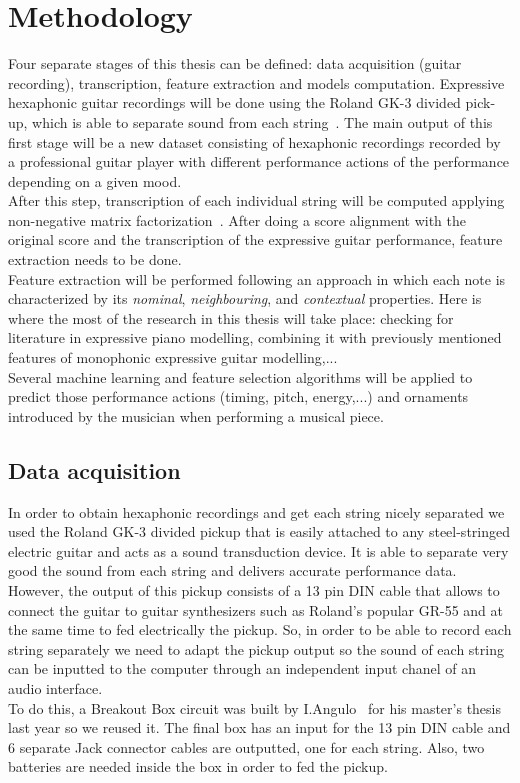 \chapter{Methodology}
\label{chap:methods}
Four separate stages of this thesis can be defined: data acquisition (guitar recording), transcription, feature extraction and models computation. Expressive hexaphonic guitar recordings will be done using the Roland GK-3 divided pick-up, which is able to separate sound from each string~\cite{Angulo2016}. The main output of this first stage will be a new dataset consisting of hexaphonic recordings recorded by a professional guitar player with different performance actions of the performance depending on a given mood. \\
After this step, transcription of each individual string will be computed applying non-negative matrix factorization~\cite{OGrady2009}. After doing a score alignment with the original score and the transcription of the expressive guitar performance, feature extraction needs to be done.\\
Feature extraction will be performed following an approach in which each note is characterized by its \textit{nominal}, \textit{neighbouring}, and \textit{contextual} properties.  Here is where the most of the research in this thesis will take place:  checking for literature in expressive piano modelling, combining it with previously mentioned features of monophonic expressive guitar modelling,... \\
Several machine learning and feature selection algorithms will be applied to predict those performance actions (timing, pitch, energy,...) and ornaments introduced by the musician when performing a musical piece.


\section{Data acquisition}
In order to obtain hexaphonic recordings and get each string nicely separated we used the Roland GK-3 divided pickup that is easily attached to any steel-stringed electric guitar and acts as a sound transduction device. It is able to separate very good the sound from each string and delivers accurate performance data. \\
However, the output of this pickup consists of a 13 pin DIN cable that allows to connect the guitar to guitar synthesizers such as Roland's popular GR-55 and at the same time to fed electrically the pickup. So, in order to be able to record each string separately we need to adapt the pickup output so the sound of each string can be inputted to the computer through an independent input chanel of an audio interface.\\
To do this, a Breakout Box circuit was built by I.Angulo~\cite{Angulo2016} for his master's thesis last year so we reused it. The final box has an input for the 13 pin DIN cable and 6 separate Jack connector cables are outputted, one for each string. Also, two batteries are needed inside the box in order to fed the pickup.



